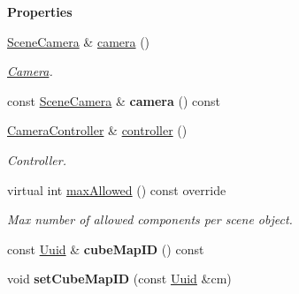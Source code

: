 \begin{Indent}\textbf{ Properties}\par
\begin{DoxyCompactItemize}
\item 
\mbox{\label{classrev_1_1_camera_component_a9ba773af7eb20b50267c16dea76ed1a3}} 
\mbox{\hyperlink{classrev_1_1_scene_camera}{Scene\+Camera}} \& \mbox{\hyperlink{classrev_1_1_camera_component_a9ba773af7eb20b50267c16dea76ed1a3}{camera}} ()
\begin{DoxyCompactList}\small\item\em \mbox{\hyperlink{classrev_1_1_camera}{Camera}}. \end{DoxyCompactList}\item 
\mbox{\label{classrev_1_1_camera_component_a9580eace705212b2f3938a1017c802cf}} 
const \mbox{\hyperlink{classrev_1_1_scene_camera}{Scene\+Camera}} \& {\bfseries camera} () const
\item 
\mbox{\label{classrev_1_1_camera_component_a06adc305237c9086cc33e124baa25090}} 
\mbox{\hyperlink{classrev_1_1_camera_controller}{Camera\+Controller}} \& \mbox{\hyperlink{classrev_1_1_camera_component_a06adc305237c9086cc33e124baa25090}{controller}} ()
\begin{DoxyCompactList}\small\item\em Controller. \end{DoxyCompactList}\item 
\mbox{\label{classrev_1_1_camera_component_a07103046e8db3a1a5c6a6684016df0ea}} 
virtual int \mbox{\hyperlink{classrev_1_1_camera_component_a07103046e8db3a1a5c6a6684016df0ea}{max\+Allowed}} () const override
\begin{DoxyCompactList}\small\item\em Max number of allowed components per scene object. \end{DoxyCompactList}\item 
\mbox{\label{classrev_1_1_camera_component_a2d05bd87de8e5ad7cc9028fcc1b07dec}} 
const \mbox{\hyperlink{classrev_1_1_uuid}{Uuid}} \& {\bfseries cube\+Map\+ID} () const
\item 
\mbox{\label{classrev_1_1_camera_component_a9cba1cda81cf15a3fe6b6a1d562b5a0f}} 
void {\bfseries set\+Cube\+Map\+ID} (const \mbox{\hyperlink{classrev_1_1_uuid}{Uuid}} \&cm)
\end{DoxyCompactItemize}
\end{Indent}
